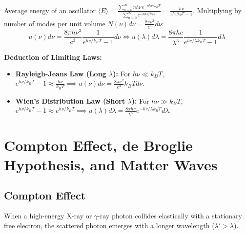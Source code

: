\documentclass[12pt,a4paper]{article}
\begin{document}
\begin{tcolorbox}[formulabox, title={\textbf{Planck's Black Body Radiation Law Derivation}}]
Average energy of an oscillator $\langle E \rangle = \frac{\sum_{n=0}^\infty n h\nu \, e^{-n h\nu / k_B T}}{\sum_{n=0}^\infty e^{-n h\nu / k_B T}} = \frac{h\nu}{e^{h\nu / k_B T} - 1}$.
Multiplying by number of modes per unit volume $N(\nu)d\nu = \frac{8\pi \nu^2}{c^3} d\nu$:
\begin{equation}
u(\nu) d\nu = \frac{8\pi h \nu^3}{c^3} \frac{1}{e^{h\nu / k_B T} - 1} d\nu \iff u(\lambda) d\lambda = \frac{8\pi h c}{\lambda^5} \frac{1}{e^{hc / \lambda k_B T} - 1} d\lambda
\end{equation}
\end{tcolorbox}

\textbf{Deduction of Limiting Laws:}\par\noindent
\begin{itemize}[leftmargin=*, itemsep=3pt]
  \item \textbf{Rayleigh-Jeans Law (Long $\lambda$):} For $h\nu \ll k_B T$, $e^{h\nu/k_B T} - 1 \approx \frac{h\nu}{k_B T} \implies u(\nu)d\nu = \frac{8\pi \nu^2}{c^3} k_B T d\nu$.
  \item \textbf{Wien's Distribution Law (Short $\lambda$):} For $h\nu \gg k_B T$, $e^{h\nu/k_B T} - 1 \approx e^{h\nu/k_B T} \implies u(\lambda)d\lambda = \frac{8\pi hc}{\lambda^5} e^{-hc/\lambda k_B T} d\lambda$.
\end{itemize}

\section{Compton Effect, de Broglie Hypothesis, and Matter Waves}

\subsection{Compton Effect}

When a high-energy X-ray or $\gamma$-ray photon collides elastically with a stationary free electron, the scattered photon emerges with a longer wavelength ($\lambda' > \lambda$).
\end{document}
